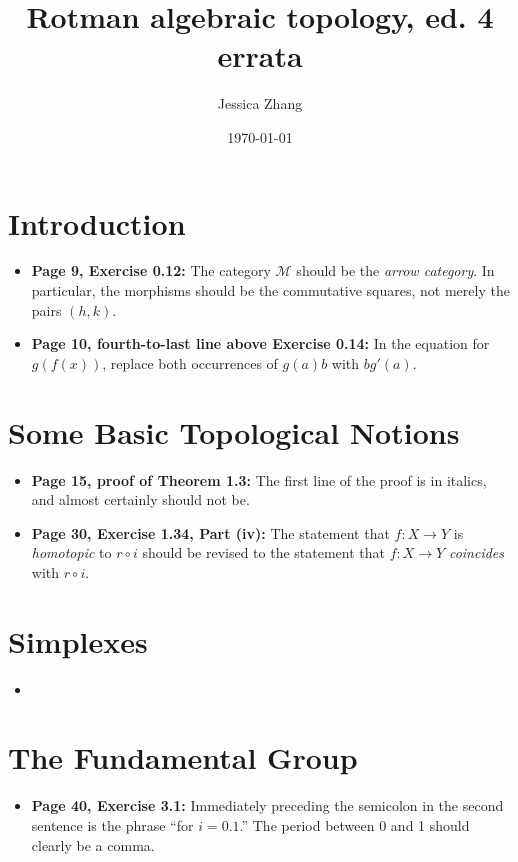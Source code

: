 \documentclass{article}
\title{Rotman algebraic topology, ed. 4 errata}
\author{Jessica Zhang}
\date{\today}
\newcommand*\loc[1]{\textbf{#1:}}
\begin{document}
\maketitle

\section{Introduction} 
\begin{itemize} 
\item \loc{Page 9, Exercise 0.12} 
The category $\mathcal M$ should be the \emph{arrow category}. In particular, the morphisms should be the commutative squares, not merely the pairs $(h,k)$. 

\item \loc{Page 10, fourth-to-last line above Exercise 0.14} 
In the equation for $g(f(x))$, replace both occurrences of $g(a)b$ with $bg'(a)$. 
\end{itemize} 

\section{Some Basic Topological Notions} 
\begin{itemize}
\item \loc{Page 15, proof of Theorem 1.3} 
The first line of the proof is in italics, and almost certainly should not be. 

\item \loc{Page 30, Exercise 1.34, Part (iv)} 
The statement that $f:X\to Y$ is \emph{homotopic} to $r\circ i$ should be revised to the statement that $f:X\to Y$ \emph{coincides} with $r\circ i$. 
\end{itemize}

\section{Simplexes} 
\begin{itemize}
\item 
\end{itemize} 

\section{The Fundamental Group} 
\begin{itemize}
\item \loc{Page 40, Exercise 3.1} 
Immediately preceding the semicolon in the second sentence is the phrase ``for $i=0.1$.'' The period between 0 and 1 should clearly be a comma. 
\end{itemize} 
\end{document}
